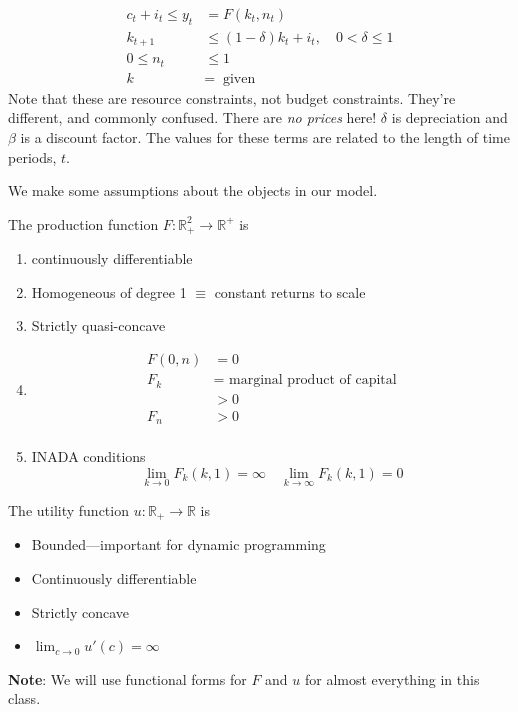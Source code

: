\documentclass[11pt]{article}
\newcommand{\R}{\mathbb{R}}
\begin{document}
\begin{align*}
c_t + i_t \le y_t &= F(k_t, n_t) \tag{resource constraint}\\
k_{t + 1} &\le (1 - \delta)k_t + i_t, \quad 0 < \delta \le 1\\
0 \le n_t &\le 1\\
k &=\ \text{ given}
\end{align*}
Note that these are resource constraints, not budget constraints. They're different, and commonly confused. There are \emph{no prices} here! \(\delta\) is depreciation and \(\beta\) is a discount factor. The values for these terms are related to the length of time periods, \(t\).

We make some assumptions about the objects in our model. 

The production function \(F: \R^2_+ \to \R^+\) is

\begin{enumerate}
\item continuously differentiable
\item Homogeneous of degree  1 $\equiv$ constant returns to scale
\item Strictly quasi-concave
\item \begin{align*}
      F(0, n) &= 0 \tag{capital is essential}\\
F_k &= \text{ marginal product of capital}\\
&> 0 \\
F_n &> 0 \tag{ marginal product of labor }\\
 \end{align*}
\item INADA conditions
\[
\lim_{k \to 0} F_k(k, 1) = \infty \quad \lim_{k \to \infty} F_k(k, 1) = 0
\]
\end{enumerate}

The utility function \(u: \R_+ \to \R\) is
\begin{itemize}
\item Bounded---important for dynamic programming
\item Continuously differentiable
\item Strictly concave
\item $\lim_{c \to 0} u'(c) = \infty$
\end{itemize}

\textbf{Note}: We will use functional forms for \(F\) and \(u\) for almost everything in this class.
\end{document}
